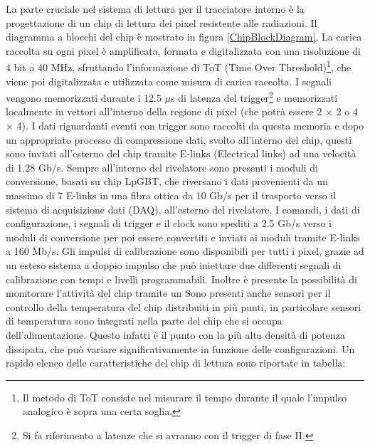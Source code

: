 La parte cruciale nel sistema di lettura per il tracciatore interno è la progettazione di un chip di lettura dei pixel resistente alle radiazioni. Il diagramma a blocchi del chip è mostrato in figura \ref{ChipBlockDiagram}. 
La carica raccolta su ogni pixel è amplificata, formata e digitalizzata con una risoluzione di 4 bit a 40 MHz, sfruttando l'informazione di ToT (Time Over Threshold)\footnote{Il metodo di ToT consiste nel misurare il tempo durante il quale l'impulso analogico è sopra una certa soglia.}, che viene poi digitalizzata e utilizzata come misura di carica raccolta. 
I segnali vengono memorizzati durante i 12.5 $\mu$s di latenza del trigger\footnote{Si fa riferimento a latenze che si avranno con il trigger di fase II.} e memorizzati localmente in vettori all'interno della regione di pixel (che potrà essere 2 $\times$ 2 o 4 $\times$ 4). 
I dati riguardanti eventi con trigger sono raccolti da questa memoria e dopo un appropriato processo di compressione dati, svolto all'interno del chip, questi sono inviati all'esterno del chip tramite E-links (Electrical links) ad una velocità di 1.28 Gb/s. 
Sempre all'interno del rivelatore sono presenti i moduli di conversione, basati su chip LpGBT, che riversano i dati provenienti da un massimo di 7  E-links in una fibra ottica da 10 Gb/s per il trasporto verso il sistema di acquisizione dati (DAQ), all'esterno del rivelatore. 
I comandi, i dati di configurazione, i segnali di trigger e il clock sono spediti a 2.5 Gb/s verso i moduli di conversione per poi essere convertiti e inviati ai moduli tramite E-links a 160 Mb/s. 
Gli impulsi di calibrazione sono disponibili per tutti i pixel, grazie ad un esteso sistema a doppio impulso che può iniettare due differenti segnali di calibrazione con tempi e livelli programmabili. 
Inoltre è presente la possibilità di monitorare l'attività del chip tramite un 
Sono presenti anche sensori per il controllo della temperatura del chip distribuiti in più punti, in particolare sensori di temperatura sono integrati nella parte del chip che si occupa dell'alimentazione. Questo infatti è il punto con la più alta densità di potenza dissipata, che può variare significativamente in funzione delle configurazioni. 
Un rapido elenco delle caratteristiche del chip di lettura sono riportate in tabella:

